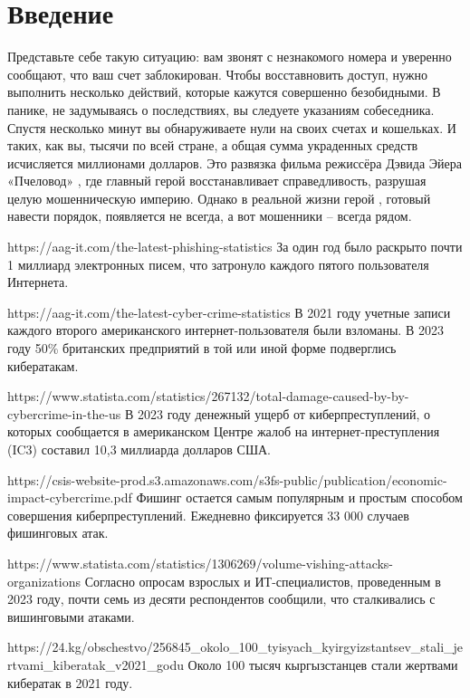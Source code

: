 \section*{\centering Введение}

Представьте себе такую ситуацию: вам звонят с незнакомого номера и уверенно сообщают, что ваш счет заблокирован. Чтобы восставновить доступ, нужно выполнить несколько действий, которые кажутся совершенно безобидными. В панике, не задумываясь о последствиях, вы следуете указаниям собеседника. Спустя несколько минут вы обнаруживаете нули на своих счетах и кошельках. И таких, как вы, тысячи по всей стране, а общая сумма украденных средств исчисляется миллионами долларов. Это развязка фильма режиссёра Дэвида Эйера «Пчеловод» \cite{beekeeper2024}, где главный герой восстанавливает справедливость, разрушая целую мошенническую империю. Однако в реальной жизни герой \cite{fraud2024}, готовый навести порядок, появляется не всегда, а вот мошенники – всегда рядом.

https://aag-it.com/the-latest-phishing-statistics
За один год было раскрыто почти 1 миллиард электронных писем, что затронуло каждого пятого пользователя Интернета.

https://aag-it.com/the-latest-cyber-crime-statistics
В 2021 году учетные записи каждого второго американского интернет-пользователя были взломаны.
В 2023 году 50\% британских предприятий в той или иной форме подверглись кибератакам.

https://www.statista.com/statistics/267132/total-damage-caused-by-by-cybercrime-in-the-us
В 2023 году денежный ущерб от киберпреступлений, о которых сообщается в американском Центре жалоб на интернет-преступления (IC3) составил 10,3 миллиарда долларов США.

https://csis-website-prod.s3.amazonaws.com/s3fs-public/publication/economic-impact-cybercrime.pdf
Фишинг остается самым популярным и простым способом совершения киберпреступлений. Ежедневно фиксируется 33 000 случаев фишинговых атак.

https://www.statista.com/statistics/1306269/volume-vishing-attacks-organizations
Согласно опросам взрослых и ИТ-специалистов, проведенным в 2023 году, почти семь из десяти респондентов сообщили, что сталкивались с вишинговыми атаками.

https://24.kg/obschestvo/256845_okolo_100_tyisyach_kyirgyizstantsev_stali_jertvami_kiberatak_v2021_godu
Около 100 тысяч кыргызстанцев стали жертвами кибератак в 2021 году.

